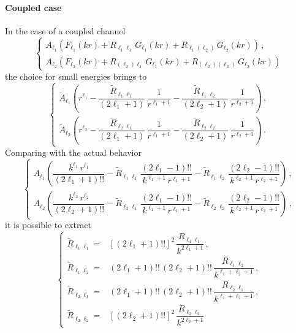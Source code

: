 \documentclass[10pt,a4paper]{article}
\begin{document}
		\paragraph{Coupled case}
		In the case of a coupled channel
		\begin{equation}
			\begin{cases}
				A_{\ell_1} \left(F_{\ell_1}(kr) + R_{\ell_1\ell_1}\,G_{\ell_1}(kr) + 
				R_{\ell_1(\ell_2)}\,G_{\ell_2}(kr)\right)\,,\\
				A_{\ell_2} \left(F_{\ell_2}(kr) + R_{(\ell_2)\ell_1}\,G_{\ell_1}(kr) + 
				R_{(\ell_2)(\ell_2)}\,G_{\ell_2}(kr)\right)
			\end{cases}
		\end{equation}
		the choice for small energies brings to
		\begin{equation}
			\begin{cases}
				\tilde{A}_{\ell_1}
				\left(
				r^{\ell_1} - \dfrac{\tilde{R}_{\ell_1\ell_1}}{(2\ell_1+1)}\,
				\dfrac{1}{r^{\ell_1+1}} - \dfrac{\tilde{R}_{\ell_1\ell_2}}{(2\ell_2+1)}\,
				\dfrac{1}{r^{\ell_2+1}}
				\right)\,,\\[2.5ex]
				\tilde{A}_{\ell_2}
				\left(
				r^{\ell_2} - \dfrac{\tilde{R}_{\ell_2\ell_1}}{(2\ell_1+1)}\,
				\dfrac{1}{r^{\ell_1+1}} - \dfrac{\tilde{R}_{\ell_2\ell_2}}{(2\ell_2+1)}\,
				\dfrac{1}{r^{\ell_2+1}}
				\right)\,.
			\end{cases}
		\end{equation}
		Comparing with the actual behavior
		\begin{equation}
			\begin{cases}
				A_{\ell_1}
				\left(
				\dfrac{k^{\ell_1}\,r^{\ell_1}}{(2\ell_1+1)!!} - \tilde{R}_{\ell_1\ell_1}\,
				\dfrac{(2\ell_1-1)!!}{k^{\ell_1+1}\,r^{\ell_1+1}} - \tilde{R}_{\ell_1\ell_2}\,
				\dfrac{(2\ell_2-1)!!}{k^{\ell_2+1}\,r^{\ell_2+1}}
				\right)\,,\\[2.5ex]
				A_{\ell_2}
				\left(
				\dfrac{k^{\ell_2}\,r^{\ell_2}}{(2\ell_2+1)!!} - \tilde{R}_{\ell_2\ell_1}\,
				\dfrac{(2\ell_1-1)!!}{k^{\ell_1+1}\,r^{\ell_1+1}} - \tilde{R}_{\ell_2\ell_2}\,
				\dfrac{(2\ell_2-1)!!}{k^{\ell_2+1}\,r^{\ell_2+1}}
				\right)\,,
			\end{cases}
		\end{equation}
		it is possible to extract
		\begin{equation}
			\begin{cases}
				\tilde{R}_{\ell_1\ell_1} =& 
				\left[(2\ell_1+1)!!\right]^2\,\dfrac{R_{\ell_1\ell_1}}{k^{2\ell_1+1}}\,,\\[2.ex]
				\tilde{R}_{\ell_1\ell_2} =& 
				(2\ell_1+1)!!\,(2\ell_2+1)!!\,\dfrac{R_{\ell_1\ell_2}}{k^{\ell_1+\ell_2+1}}\,,\\[2.ex]
				\tilde{R}_{\ell_2\ell_1} =& 
				(2\ell_1+1)!!\,(2\ell_2+1)!!\,\dfrac{R_{\ell_2\ell_1}}{k^{\ell_1+\ell_2+1}}\,,\\[2.ex]
				\tilde{R}_{\ell_2\ell_2} =& 
				\left[(2\ell_2+1)!!\right]^2\,\dfrac{R_{\ell_2\ell_2}}{k^{2\ell_2+1}}
			\end{cases}
		\end{equation}
\end{document}
